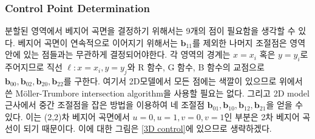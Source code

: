 \documentclass{gshs_thesis}
\theoremstyle{theorem}
\theoremstyle{lemma}
\theoremstyle{definition}
\begin{document}
\subsubsection{Control Point Determination}
분할된 영역에서  베지어 곡면을 결정하기 위해서는 9개의 점이 필요함을 생각할 수 있다. 
베지어 곡면이 연속적으로 이어지기 위해서는 $\textbf{b}_{11}$를 제외한 나머지 조절점은 영역안에 있는 점들과는 무관하게 결정되어야한다. 각 영역의 경계는 $x=x_{i}$ 혹은 $y=y_{i}$로 주어지므로 직선 $\ell \colon x=x_{i}, y=y_{j}$와 R 함수, G 함수, B 함수의 교점으로 $\textbf{b}_{00},\textbf{b}_{02},\textbf{b}_{20},\textbf{b}_{22}$를 구한다. 여기서 2D모델에서 모든 점에는 색깔이 있으므로 위에서 쓴 Möller-Trumbore intersection algorithm을 사용할 필요는 없다. 그리고 2D model 근사에서 중간 조절점을 잡은 방법을 이용하여 네 조절점 $\textbf{b}_{01},\textbf{b}_{10},\textbf{b}_{12},\textbf{b}_{21}$을 얻을 수 있다. 이는 (2,2)차 베지어 곡면에서 $u=0,u=1,v=0,v=1$인 부분은 2차 베지어 곡선이 되기 때문이다. 이에 대한 그림은 \cref{3D control}에 있으므로 생략하겠다.
\end{document}
